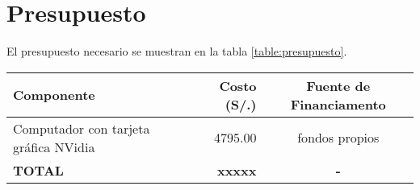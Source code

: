 \chapter{Presupuesto}
\label{chp:presupuesto}
El presupuesto necesario se muestran en la tabla \ref{table:presupuesto}.

\vspace{0.8cm}

\begin{minipage}{\linewidth}
    \centering
     \label{table:presupuesto}

    \begin{tabular}{| l | r  | c |}
    \hline
    \bf Componente & \bf Costo (S/.) & \bf Fuente de Financiamento \\
    \hline
    Computador con tarjeta gráfica NVidia   &  4795.00      & fondos propios\\
    \hline
    \bf TOTAL                               &  \bf xxxxx & \bf -\\
    \hline
    \end{tabular}
\end{minipage}
